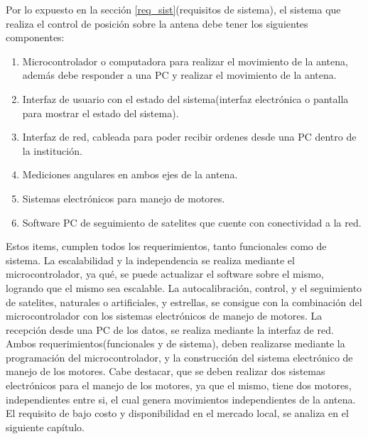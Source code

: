 Por lo expuesto en la sección \ref{req_sist}(requisitos de sistema), el sistema que realiza el control de posición sobre la antena debe tener los siguientes componentes: 

\begin{enumerate}
	\item Microcontrolador o computadora para realizar el movimiento de la antena, además debe responder a una PC y realizar el movimiento de la antena.    
	\item Interfaz de usuario con el estado del sistema(interfaz electrónica o pantalla para mostrar el estado del sistema).
	\item Interfaz de red, cableada para poder recibir ordenes desde una PC dentro de la institución. 
	\item Mediciones angulares en ambos ejes de la antena.  
	\item Sistemas electrónicos para manejo de motores. 
	\item Software PC de seguimiento de satelites que cuente con conectividad a la red.  
\end{enumerate}

Estos items, cumplen todos los requerimientos, tanto funcionales como de sistema. La escalabilidad y la independencia  se realiza mediante el microcontrolador, ya qué, se puede actualizar el software sobre el mismo, logrando que el mismo sea escalable. La autocalibración, 
control, y el seguimiento de satelites, naturales o artificiales, y estrellas, se consigue con la combinación del microcontrolador con los sistemas electrónicos de manejo de motores. La recepción desde una PC de los datos, se realiza mediante la interfaz de red. Ambos requerimientos(funcionales y de sistema), deben realizarse mediante la programación del microcontrolador, y la construcción del sistema electrónico de manejo de los motores. Cabe destacar, que se deben realizar dos sistemas electrónicos para el manejo de los motores, ya que el mismo, tiene dos motores, independientes entre si, el cual genera movimientos independientes de la antena. El requisito de bajo costo y disponibilidad en el mercado local, se analiza en el siguiente capítulo. 



